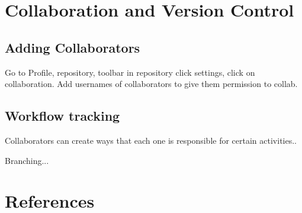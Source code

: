 \documentclass[12pt]{../SOP4_alpha}\usepackage[]{graphicx}\usepackage[]{color}
\begin{document}
\section{Collaboration and Version Control}

\subsection{Adding Collaborators}
\NP Go to Profile, repository, toolbar in repository click settings, click on collaboration. Add usernames of collaborators to give them permission to collab.

\subsection{Workflow tracking}

\NP Collaborators can create ways that each one is responsible for certain activities..

\NP Branching...
 

\section{References}

\NP 
\end{document}
